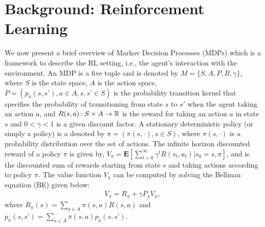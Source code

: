 \section{Background: Reinforcement Learning}
We now present a brief overview of Markov Decision Processes (MDPs) which is a framework to describe the RL setting, i.e., the agent's interaction with the environment. An MDP is a five tuple and is denoted by $M=\{S,A,P,R,\gamma\}$, where $S$ is the state space, $A$ is the action space, $P=(p_a(s,s'),a\in A,s,s’\in S)$ is the probability transition kernel that specifies the probability of transitioning from state $s$ to $s'$ when the agent taking an action $a$, and $R(s,a)\colon S\times A\rightarrow \mathbb{R}$ is the reward for taking an action $a$ in state $s$ and $0<\gamma<1$ is a given discount factor. A stationary deterministic policy (or simply a policy) is a denoted by $\pi=(\pi(s,\cdot),s\in S)$, where $\pi(s,\cdot)$ is a probability distribution over the set of actions. The infinite horizon discounted reward of a policy $\pi$ is given by, $V_\pi=\mathbf{E}[\sum_{t=0}^\infty \gamma^t R(s_t,a_t)| s_0=s, \pi]$,
and is the discounted sum of rewards starting from state $s$ and taking actions according to policy $\pi$. The value function $V_\pi$ can be computed by solving the Bellman equation (BE) given below:
\begin{align}\label{be}
V_\pi=R_\pi+\gamma P_\pi V_\pi,
\end{align}
where $R_\pi(s)=\sum_{a\in A}\pi(s,a) R(s,a)$ and $p_\pi(s,s’)=\sum_{a\in A}\pi(s,a)p_a(s,s’)$.\par
